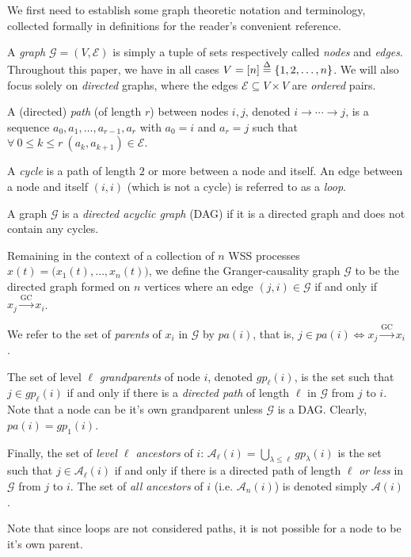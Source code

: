 \documentclass[12pt]{article}
\def\gc{\overset{\text{GC}}{\rightarrow}}  %
\def\gcg{\mathcal{G}}  %
\def\gcge{\mathcal{E}}  %
\newcommand{\pa}[1]{pa(#1)}  %
\newcommand{\anc}[1]{\mathcal{A}(#1)}  %
\newcommand{\ancn}[2]{\mathcal{A}_{#1}(#2)}  %
\newcommand{\gpn}[2]{gp_{#1}(#2)}  %
\newcommand{\gcgpath}[2]{#1 \rightarrow \cdots \rightarrow #2}  %
\begin{document}
We first need to establish some graph theoretic notation and
terminology, collected formally in definitions for the reader's
convenient reference.

\begin{definition}
  A \textit{graph} $\gcg = (V, \gcge)$ is simply a
  tuple of sets respectively called \textit{nodes} and \textit{edges}.
  Throughout this paper, we have in all cases
  $V = [n] \overset{\Delta}{=} \{1, 2, \ldots, n\}$.  We will also focus solely on
  \textit{directed} graphs, where the edges
  $\gcge \subseteq V \times V$ are \textit{ordered} pairs.

  A (directed) \textit{path} (of length $r$) between nodes $i, j$,
  denoted $\gcgpath{i}{j}$, is a sequence
  $a_0, a_1, \ldots, a_{r - 1}, a_r$ with $a_0 = i$ and $a_r = j$ such
  that $\forall\ 0 \le k \le r\ (a_k, a_{k + 1}) \in \gcge$.

  A \textit{cycle} is a path of length $2$ or more between a node and
  itself.  An edge between a node and itself $(i, i)$ (which is not a
  cycle) is referred to as a \textit{loop}.

  A graph $\gcg$ is a \textit{directed acyclic graph} (DAG) if it is a
  directed graph and does not contain any cycles.
\end{definition}

\begin{definition}

Remaining in the context of a collection of $n$ WSS processes
$x(t) = \big(x_1(t), \ldots, x_n(t)\big)$, we define the Granger-causality
graph $\gcg$ to be the directed graph formed on $n$ vertices where an
edge $(j, i) \in \gcg$ if and only if $x_j \gc x_i$.

We refer to the set of \textit{parents} of $x_i$ in $\gcg$ by
$\pa{i}$, that is, $j \in \pa{i} \iff x_j \gc x_i$.
\end{definition}

\begin{definition}
  The set of level $\ell$ \textit{grandparents} of node $i$, denoted
  $\gpn{\ell}{i}$, is the set such that $j \in \gpn{\ell}{i}$ if and
  only if there is a \textit{directed path} of length $\ell$ in $\gcg$
  from $j$ to $i$.  Note that a node can be it's own grandparent
  unless $\gcg$ is a DAG.  Clearly, $\pa{i} = \gpn{1}{i}$.

  Finally, the set of \textit{level $\ell$ ancestors} of $i$:
  $\ancn{\ell}{i} = \bigcup_{\lambda \le \ell}\gpn{\lambda}{i}$ is the
  set such that $j \in \ancn{\ell}{i}$ if and only if there is a
  directed path of length $\ell$ \textit{or less} in $\gcg$ from $j$
  to $i$.  The set of \textit{all ancestors} of $i$
  (i.e. $\ancn{n}{i}$) is denoted simply $\anc{i}$.

  Note that since loops are not considered paths, it is not possible
  for a node to be it's own parent.
\end{definition}
\end{document}
